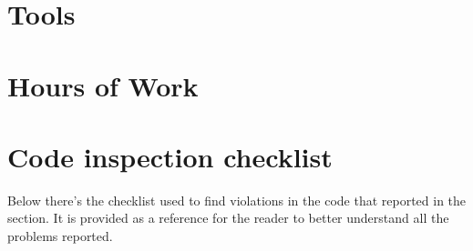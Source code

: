 \newpage
\begin{appendices}
\section{Tools}
\section{Hours of Work}
\section{Code inspection checklist}
Below there's the checklist used to find violations in the code that reported in the  section. It is provided as a reference for the reader to better understand all the problems reported.

\end{appendices}